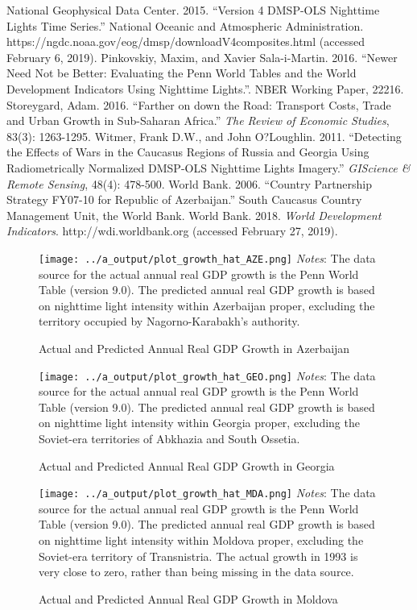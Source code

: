 \documentclass[12pt,a4paper]{article}%
\begin{document}
\begin{thebibliography}{99}
\bibitem{} National Geophysical Data Center. 2015. ``Version 4 DMSP-OLS Nighttime Lights Time Series.'' National Oceanic and Atmospheric Administration. https://ngdc.noaa.gov/eog/dmsp/downloadV4composites.html (accessed February 6, 2019).
\bibitem{} Pinkovskiy, Maxim, and Xavier Sala-i-Martin. 2016. ``Newer Need Not be Better: Evaluating the Penn World Tables and the World Development Indicators Using Nighttime Lights.''. NBER Working Paper, 22216.
\bibitem{} Storeygard, Adam. 2016. ``Farther on down the Road: Transport Costs, Trade and Urban Growth in Sub-Saharan Africa.'' \textit{The Review of Economic Studies}, 83(3): 1263-1295.
\bibitem{} Witmer, Frank D.W., and John O?Loughlin. 2011. ``Detecting the Effects of Wars in the Caucasus Regions of Russia and Georgia Using Radiometrically Normalized DMSP-OLS Nighttime Lights Imagery.'' \textit{GIScience \& Remote Sensing}, 48(4): 478-500.
\bibitem{} World Bank. 2006. ``Country Partnership Strategy FY07-10 for Republic of Azerbaijan.'' South Caucasus Country Management Unit, the World Bank.
\bibitem{} World Bank. 2018. \textit{World Development Indicators}. http://wdi.worldbank.org (accessed February 27, 2019).
\end{thebibliography}

\begin{figure}[ptb]
\caption{Actual and Predicted Annual Real GDP Growth in Azerbaijan}%
\label{aze}%
\texttt{[image: ../a\_output/plot\_growth\_hat\_AZE.png]}
{\scriptsize \textit{Notes}: 
	The data source for the actual annual real GDP growth is the Penn World Table (version 9.0). 
	The predicted annual real GDP growth is based on nighttime light intensity within Azerbaijan proper, excluding the territory occupied by Nagorno-Karabakh's authority. 
}
\end{figure}

\begin{figure}[ptb]
\caption{Actual and Predicted Annual Real GDP Growth in Georgia}%
\label{geo}%
\texttt{[image: ../a\_output/plot\_growth\_hat\_GEO.png]}
{\scriptsize \textit{Notes}: 
	The data source for the actual annual real GDP growth is the Penn World Table (version 9.0). 
	The predicted annual real GDP growth is based on nighttime light intensity within Georgia proper, excluding the Soviet-era territories of Abkhazia and South Ossetia. 
}
\end{figure}

\begin{figure}[ptb]
\caption{Actual and Predicted Annual Real GDP Growth in Moldova}%
\label{mda}%
\texttt{[image: ../a\_output/plot\_growth\_hat\_MDA.png]}
{\scriptsize \textit{Notes}: 
	The data source for the actual annual real GDP growth is the Penn World Table (version 9.0). 
	The predicted annual real GDP growth is based on nighttime light intensity within Moldova proper, excluding the Soviet-era territory of Transnistria. 
	The actual growth in 1993 is very close to zero, rather than being missing in the data source.
}
\end{figure}
\end{document}
